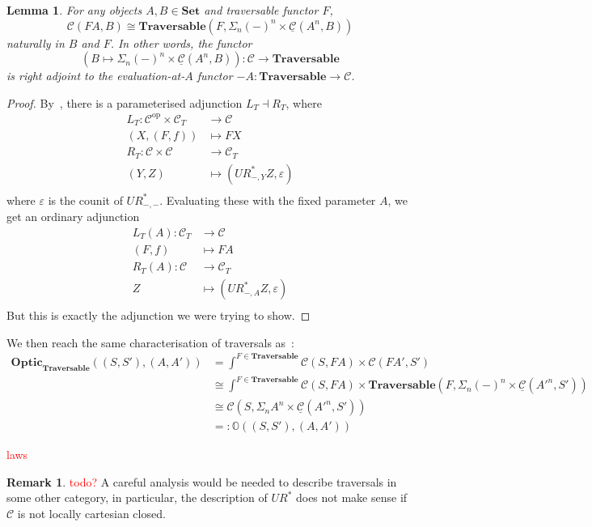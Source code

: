\documentclass[11pt,a4paper]{article}
\theoremstyle{plain}
\newtheorem{lemma}[theorem]{Lemma}
\theoremstyle{definition}
\newtheorem{remark}[theorem]{Remark}
\newcommand{\C}{\mathscr{C}}
\newcommand{\homC}{\underline{\C}}
\newcommand{\Set}{\mathbf{Set}}
\newcommand{\Traversable}{\mathbf{Traversable}}
\newcommand{\Optic}{\mathbf{Optic}}
\newcommand{\op}{\mathrm{op}}
\newcommand{\todo}[1]{\textcolor{red}{\small #1}}
\begin{document}
\begin{lemma}
  For any objects $A, B \in \Set$ and traversable functor $F$, \[\C(FA, B) \cong \Traversable(F, \Sigma_n (-)^n \times \homC(A^n,B))\]
naturally in $B$ and $F$. In other words, the functor \[(B \mapsto \Sigma_n (-)^n \times \homC(A^n,B)) : \C \to \Traversable\] is right adjoint to the evaluation-at-$A$ functor $-A : \Traversable \to \C$.
\end{lemma}
\begin{proof}
By~\cite[Proposition 6]{AlgebrasForParameterisedMonads}, there is a parameterised adjunction $L_T \dashv R_T$, where
\begin{align*}
L_T : \C^\op \times \C_T &\to \C \\
(X, (F, f)) &\mapsto FX \\
R_T : \C \times \C &\to \C_T \\
(Y, Z) &\mapsto (UR^*_{-, Y} Z, \varepsilon) \\
\end{align*}
where $\varepsilon$ is the counit of $UR^*_{-, -}$. Evaluating these with the fixed parameter $A$, we get an ordinary adjunction 
\begin{align*}
L_T(A) : \C_T &\to \C \\
(F, f) &\mapsto FA \\
R_T(A) : \C &\to \C_T \\
Z &\mapsto (UR^*_{-, A} Z, \varepsilon) \\
\end{align*}
But this is exactly the adjunction we were trying to show.
\end{proof}

We then reach the same characterisation of traversals as~\cite{ProfunctorOptics}:
\begin{align*}
\Optic_\Traversable((S, S'), (A, A')) &= \int^{F \in \Traversable} \C(S, F A) \times \C(F A', S') \\
&\cong \int^{F \in \Traversable} \C(S, F A) \times \Traversable(F, \Sigma_n (-)^n \times \homC(A'^n,S')) \\
&\cong \C(S, \Sigma_n A^n \times \homC(A'^n,S')) \\
&=: \mathbb{O}((S, S'), (A, A'))
\end{align*}

\todo{laws}

\begin{remark}
\todo{todo?} A careful analysis would be needed to describe traversals in some other category, in particular, the description of $UR^*$ does not make sense if $\C$ is not locally cartesian closed.
\end{remark}
\end{document}

